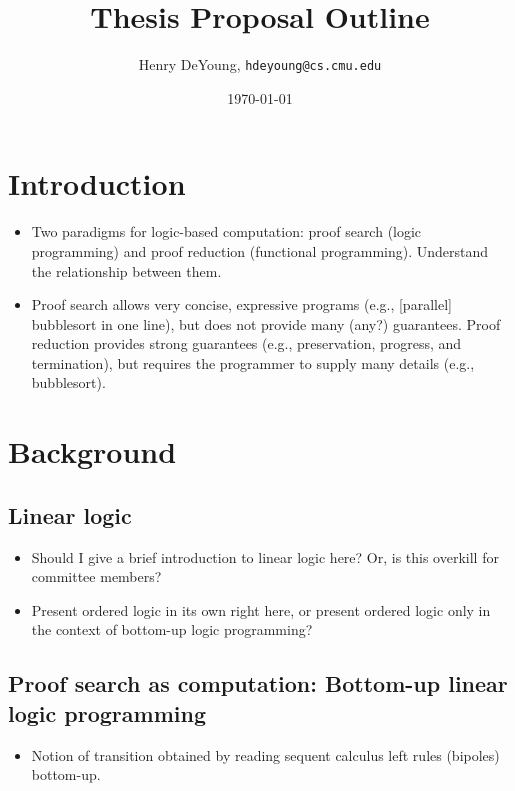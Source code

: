 \documentclass{article}
\begin{document}
\title{Thesis Proposal Outline}
\author{Henry DeYoung, \texttt{hdeyoung@cs.cmu.edu}}
\date{\today}
\maketitle

\section{Introduction}\label{sec:introduction}

\begin{itemize}
\item Two paradigms for logic-based computation: proof search (logic programming) and proof reduction (functional programming).
      Understand the relationship between them.
\item Proof search allows very concise, expressive programs (e.g., [parallel] bubblesort in one line), but does not provide many (any?) guarantees.
      Proof reduction provides strong guarantees (e.g., preservation, progress, and termination), but requires the programmer to supply many details (e.g., bubblesort).
\end{itemize}

\section{Background}\label{sec:background}

\subsection{Linear logic}\label{sec:linear-logic}

\begin{itemize}
\item Should I give a brief introduction to linear logic here?  Or, is this overkill for committee members?
\item Present ordered logic in its own right here, or present ordered logic only in the context of bottom-up logic programming?
\end{itemize}

\subsection{Proof search as computation: Bottom-up linear logic programming}\label{sec:linear-lp}

\begin{itemize}
\item Notion of transition obtained by reading sequent calculus left rules  (bipoles) bottom-up.
\end{itemize}
\end{document}
